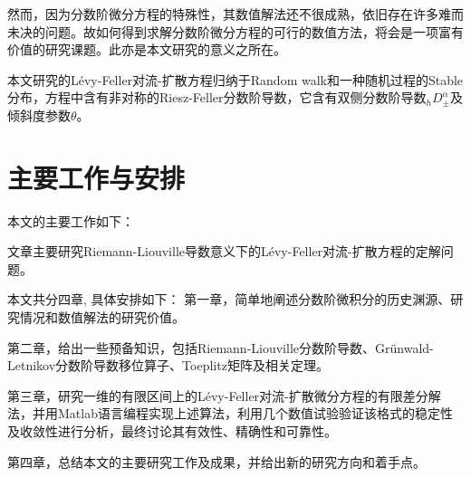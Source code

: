 然而，因为分数阶微分方程的特殊性，其数值解法还不很成熟，依旧存在许多难而未决的问题。故如何得到求解分数阶微分方程的可行的数值方法，将会是一项富有价值的研究课题。此亦是本文研究的意义之所在。

本文研究的Lévy-Feller对流-扩散方程归纳于Random walk和一种随机过程的Stable分布，方程中含有非对称的Riesz-Feller分数阶导数，它含有双侧分数阶导数$_{h} D_{ \pm}^{\alpha}$及倾斜度参数$\theta$。

\section{主要工作与安排}
本文的主要工作如下：

文章主要研究Riemann-Liouville导数意义下的Lévy-Feller对流-扩散方程的定解问题。

本文共分四章, 具体安排如下：
第一章，简单地阐述分数阶微积分的历史渊源、研究情况和数值解法的研究价值。

第二章，给出一些预备知识，包括Riemann-Liouville分数阶导数、Grünwald-Letnikov分数阶导数移位算子\cite{lqx2007}\cite{Liu2007Approximation}、Toeplitz矩阵及相关定理。

第三章，研究一维的有限区间上的Lévy-Feller对流-扩散微分方程的有限差分解法，并用Matlab语言编程实现上述算法，利用几个数值试验验证该格式的稳定性及收敛性进行分析，最终讨论其有效性、精确性和可靠性。

第四章，总结本文的主要研究工作及成果，并给出新的研究方向和着手点。
